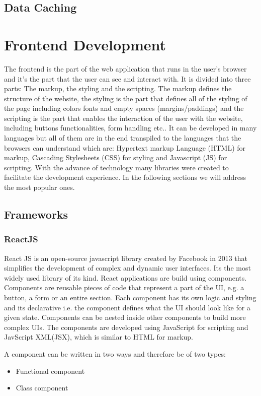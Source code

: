 \subsection{Data Caching}

\section{Frontend Development}
The frontend is the part of the web application that runs in the user's
browser and it's the part that the user can see and interact with.
It is divided into three parts: The markup, the styling and the scripting.
The markup defines the structure of the website, the styling is the part that
defines all of the styling of the page including colors fonts and empty spaces
(margins/paddings) and the scripting is the part that enables the interaction
of the user with the website, including buttons functionalities, form handling
etc..
It can be developed in many languages but all of them are in the end transpiled
to the languages that the browsers can understand which are: Hypertext markup
Language (HTML) for markup, Cascading Stylesheets (CSS) for styling and
Javascript (JS) for scripting.
With the advance of technology many libraries were created to facilitate the
development experience. In the following sections we will address the most
popular ones.

\subsection{Frameworks}

\subsubsection{ReactJS}
React JS is an open-source javascript library created by Facebook in 2013 that
simplifies the development of complex and dynamic user interfaces. Its the most widely
used library of its kind.
React applications are build using components. Components are reusable pieces of
code that represent a part of the UI, e.g. a button, a form or an entire section.
Each component has its own logic and styling and its declarative i.e. the
component defines what the UI should look like for a given state.
Components can be nested inside other components to build more complex UIs.
The components are developed using JavaScript for scripting and JavScript XML(JSX),
which is similar to HTML for markup.

A component can be written in two ways and therefore be of two types:
\begin{itemize}
	\item Functional component
	\item Class component
\end{itemize}

